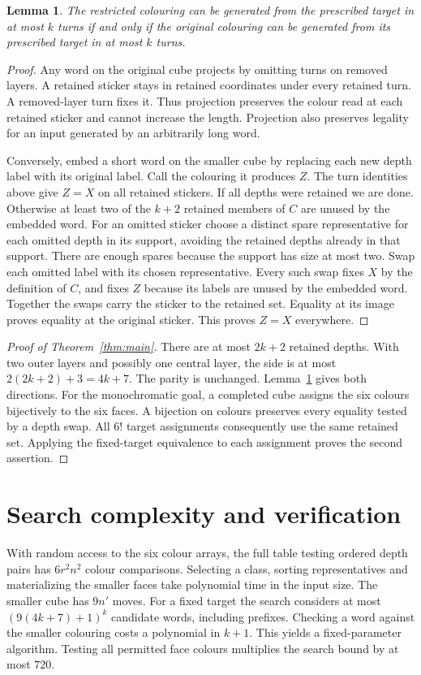 \documentclass[11pt,letterpaper]{article}
\newtheorem{lemma}[theorem]{Lemma}
\begin{document}
\begin{lemma}\label{lem:lift}
The restricted colouring can be generated from the prescribed target in
at most $k$ turns if and only if the original colouring can be generated
from its prescribed target in at most $k$ turns.
\end{lemma}
\begin{proof}
Any word on the original cube projects by omitting turns on removed layers.
A retained sticker stays in retained coordinates under every retained turn.
A removed-layer turn fixes it. Thus projection preserves the colour read
at each retained sticker and cannot increase the length. Projection also
preserves legality for an input generated by an arbitrarily long word.

Conversely, embed a short word on the smaller cube by replacing each new
depth label with its original label. Call the colouring it produces $Z$.
The turn identities above give $Z=X$ on all retained stickers. If all
depths were retained we are done. Otherwise at least two of the $k+2$
retained members of $C$ are unused by the embedded word. For an omitted
sticker choose a distinct spare representative for each omitted depth in
its support, avoiding the retained depths already in that support.
There are enough spares because the support has size at most two.
Swap each omitted label with its chosen representative. Every such swap
fixes $X$ by the definition of $C$, and fixes $Z$ because its labels are
unused by the embedded word. Together the swaps carry the sticker to the
retained set. Equality at its image proves equality at the original
sticker. This proves $Z=X$ everywhere.
\end{proof}

\begin{proof}[Proof of Theorem~\ref{thm:main}]
There are at most $2k+2$ retained depths. With two outer layers and
possibly one central layer, the side is at most $2(2k+2)+3=4k+7$.
The parity is unchanged. Lemma~\ref{lem:lift} gives both directions.
For the monochromatic goal, a completed cube assigns the six colours
bijectively to the six faces. A bijection on colours preserves every
equality tested by a depth swap. All $6!$ target assignments consequently
use the same retained set. Applying the fixed-target equivalence to each
assignment proves the second assertion.
\end{proof}

\section{Search complexity and verification}
With random access to the six colour arrays, the full table testing
ordered depth pairs has $6r^2n^2$ colour comparisons. Selecting a class,
sorting representatives and materializing the smaller faces take polynomial
time in the input size. The smaller cube has $9n'$ moves. For a fixed target
the search considers at most $(9(4k+7)+1)^k$ candidate words, including
prefixes. Checking a word against the smaller colouring costs a polynomial
in $k+1$. This yields a fixed-parameter algorithm. Testing all permitted
face colours multiplies the search bound by at most $720$.
\end{document}
